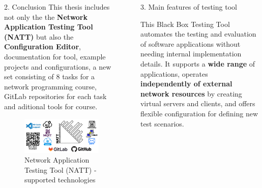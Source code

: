 \documentclass[final]{beamer}
\newlength{\sepwidth}
\newlength{\colwidth}
\newcommand{\separatorcolumn}{\begin{column}{\sepwidth}\end{column}}
\begin{document}
\begin{frame}[t]
\begin{columns}[t]
\begin{column}{\colwidth}
\begin{block}{2. Conclusion}
    \hspace{2em}This thesis includes not only the the \textbf{Network Application Testing Tool (NATT)} but also the 
    \textbf{Configuration Editor}, documentation for tool, example projects and configurations, a new set consisting of 8 tasks 
    for a network programming course, GitLab repositories for each task and aditional tools for course.

    \begin{figure}
      \centering
        \includegraphics[width=1.0\textwidth]{./imgs/natt-main-banner.png}
      \caption{Network Application Testing Tool (NATT) - supported technologies} 
    \end{figure}

  \end{block}

\end{column}

\separatorcolumn

\begin{column}{\colwidth}

  \begin{alertblock}{3. Main features of testing tool}

    This Black Box Testing Tool automates the testing and evaluation of software 
    applications without needing internal implementation details. It supports a 
    \textbf{wide range} of applications, operates \textbf{independently of external network resources} 
    by creating virtual servers and clients, and offers flexible configuration for 
    defining new test scenarios.


\end{alertblock}
\end{column}
\end{columns}
\end{frame}
\end{document}
